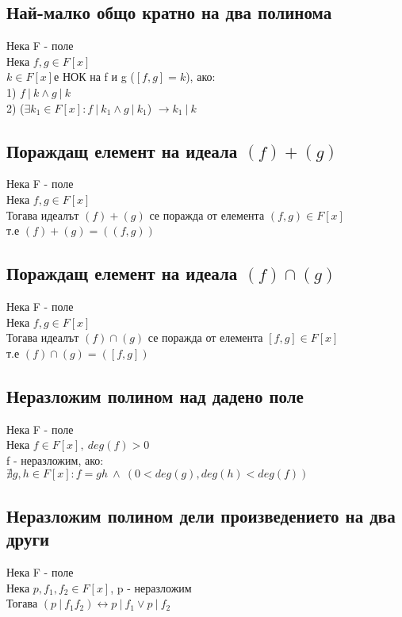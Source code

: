 \documentclass[12pt]{article}
\begin{document}
\subsection{Най-малко общо кратно на два полинома}
Нека F - поле \\
Нека $f,g \in F[x]$ \\
$k \in F[x]$е НОК на f и g ($[f,g] = k$), ако: \\
1) $f \ \vert \ k \land g \ \vert \ k$ \\
2) ($\exists k_1 \in F[x] : f \ \vert \ k_1 \land g \ \vert \ k_1$) $\rightarrow k_1 \ \vert \ k$

\subsection{Пораждащ елемент на идеала $(f) + (g)$}
Нека F - поле \\
Нека $f,g \in F[x]$ \\
Тогава идеалът $(f) + (g)$ се поражда от елемента $(f,g) \in F[x]$ \\
т.е  $(f) + (g) = ((f,g))$\\

\subsection{Пораждащ елемент на идеала $(f) \cap (g)$}
Нека F - поле \\
Нека $f,g \in F[x]$ \\
Тогава идеалът $(f) \cap (g)$ се поражда от елемента $[f,g] \in F[x]$ \\
т.е  $(f) \cap (g) = ([f,g])$\\

\subsection{Неразложим полином над дадено поле}
Нека F - поле \\
Нека $f \in F[x],\ deg(f) > 0$ \\
f - неразложим, ако: \\
$ \nexists g,h \in F[x] : f = gh\ \land\ (0 < deg(g),deg(h) < deg(f))$

\subsection{Неразложим полином дели произведението на два други}
Нека F - поле\\
Нека $p,f_1,f_2 \in F[x]$, p - неразложим \\
Тогава $(p \ \vert \ f_1f_2) \leftrightarrow p \ \vert \ f_1 \lor p \ \vert \ f_2$
\end{document}
